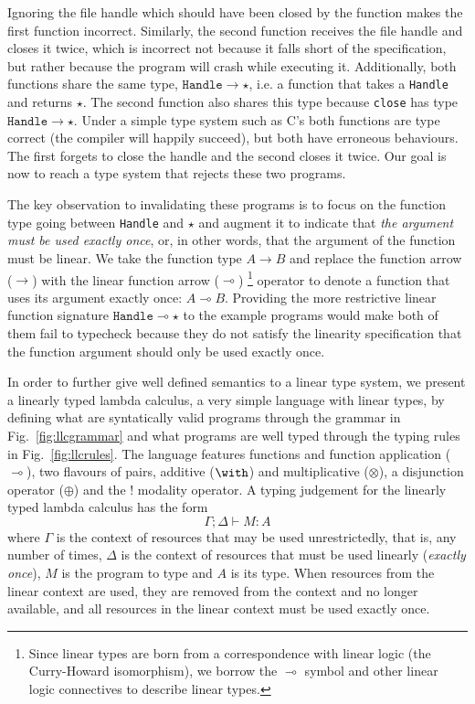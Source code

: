 \documentclass[]{lwnovathesis}
\newcommand{\lolli}{\multimap}
\newcommand{\tensor}{\otimes}
\newcommand{\bang}{{!}}
\begin{document}
Ignoring the file handle which should have been closed by the function makes the
first function incorrect. Similarly, the second function receives the file handle and
closes it twice, which is incorrect not because it falls short of the
specification, but rather because the program will crash while executing it.
%
Additionally, both functions share the same type, $\texttt{Handle} \to \star$, i.e.
a function that takes a \texttt{Handle} and returns $\star$. The second function also
shares this type because \texttt{close} has type $\texttt{Handle} \to \star$.
%
Under a simple type system such as C's both functions are type correct (the
compiler will happily succeed), but both have erroneous behaviours. The first
forgets to close the handle and the second closes it twice. Our goal is now to
reach a type system that rejects these two programs.

The key observation to invalidating these programs is to focus on the function
type going between \texttt{Handle} and $\star$ and augment it to indicate that
\emph{the argument must be used exactly once}, or, in other words, that the
argument of the function must be linear. We take the function type $A \to B$
and replace the function arrow ($\to$) with the linear function arrow ($\lolli$)
%
\footnote{Since linear types are born from a correspondence with linear
logic\cite{linear-logic} (the Curry-Howard isomorphism\cite{curry-howard}), we
borrow the $\lolli$ symbol and other linear logic connectives to describe linear
types.}
%
operator to denote a function that uses its argument exactly once: $A \lolli B$.
%
Providing the more restrictive linear function signature $\texttt{Handle} \lolli
\star$ to the example programs would make both of them fail to typecheck because
they do not satisfy the linearity specification that the function argument
should only be used exactly once.


In order to further give well defined semantics to a linear type system, we
present a linearly typed lambda calculus, a very simple language with linear
types, by defining what are syntatically valid programs through the grammar
in Fig.~\ref{fig:llcgrammar} and what programs are well typed through the typing
rules in Fig.~\ref{fig:llcrules}. The language features functions and function application ($\lolli$), two
flavours of pairs, additive ($\with$) and multiplicative ($\tensor$), a
disjunction operator ($\oplus$) and the $\bang$
modality operator. A typing
judgement for the linearly typed lambda calculus has the form
%
\[ \Gamma; \Delta \vdash M : A \]
%
where $\Gamma$ is the context of resources that may be used unrestrictedly, that
is, any number of times, $\Delta$ is the context of resources that must be used
linearly (\emph{exactly once}), $M$ is the program to type and $A$ is its type.
When resources from the linear context are used, they are removed from the
context and no longer available, and all resources in the linear context must be
used exactly once.
\end{document}
